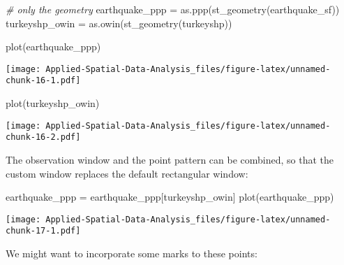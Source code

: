 \documentclass[
]{book}
\newenvironment{Shaded}{\begin{snugshade}}{\end{snugshade}}
\newcommand{\AttributeTok}[1]{\textcolor[rgb]{0.77,0.63,0.00}{#1}}
\newcommand{\CommentTok}[1]{\textcolor[rgb]{0.56,0.35,0.01}{\textit{#1}}}
\newcommand{\ConstantTok}[1]{\textcolor[rgb]{0.00,0.00,0.00}{#1}}
\newcommand{\FunctionTok}[1]{\textcolor[rgb]{0.00,0.00,0.00}{#1}}
\newcommand{\NormalTok}[1]{#1}
\newcommand{\OtherTok}[1]{\textcolor[rgb]{0.56,0.35,0.01}{#1}}
\newcommand{\SpecialCharTok}[1]{\textcolor[rgb]{0.00,0.00,0.00}{#1}}
\begin{document}
\begin{Shaded}
\begin{Highlighting}[]
\CommentTok{\# only the geometry}
\NormalTok{earthquake\_ppp }\OtherTok{=} \FunctionTok{as.ppp}\NormalTok{(}\FunctionTok{st\_geometry}\NormalTok{(earthquake\_sf))}
\NormalTok{turkeyshp\_owin }\OtherTok{=} \FunctionTok{as.owin}\NormalTok{(}\FunctionTok{st\_geometry}\NormalTok{(turkeyshp))}

\FunctionTok{plot}\NormalTok{(earthquake\_ppp)}
\end{Highlighting}
\end{Shaded}

\texttt{[image: Applied-Spatial-Data-Analysis\_files/figure-latex/unnamed-chunk-16-1.pdf]}

\begin{Shaded}
\begin{Highlighting}[]
\FunctionTok{plot}\NormalTok{(turkeyshp\_owin)}
\end{Highlighting}
\end{Shaded}

\texttt{[image: Applied-Spatial-Data-Analysis\_files/figure-latex/unnamed-chunk-16-2.pdf]}

The observation window and the point pattern can be combined, so that the custom window replaces the default rectangular window:

\begin{Shaded}
\begin{Highlighting}[]
\NormalTok{earthquake\_ppp }\OtherTok{=}\NormalTok{ earthquake\_ppp[turkeyshp\_owin]}
\FunctionTok{plot}\NormalTok{(earthquake\_ppp)}
\end{Highlighting}
\end{Shaded}

\texttt{[image: Applied-Spatial-Data-Analysis\_files/figure-latex/unnamed-chunk-17-1.pdf]}

We might want to incorporate some marks to these points:

\begin{Shaded}
\end{Shaded}
\end{document}
